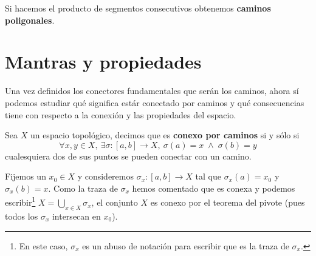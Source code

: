 \begin{ej}
Si hacemos el producto de segmentos consecutivos obtenemos \textbf{caminos poligonales}. 
\end{ej}

\section{Mantras y propiedades}%
\label{sec:conexion_por_caminos}
Una vez definidos los conectores fundamentales que serán los caminos, ahora sí podemos estudiar qué significa estár conectado por caminos y qué consecuencias tiene con respecto a la conexión y las propiedades del espacio.

\begin{defi}
Sea $X$ un espacio topológico, decimos que es \textbf{conexo por caminos} si y sólo si 
\[
\forall x, y \in X,\ \exists \sigma: \left[ a, b \right] \rightarrow X,\ \sigma\left( a \right) = x\; \land \;\sigma\left( b \right) = y
\]
cualesquiera dos de sus puntos se pueden conectar con un camino.
\end{defi}

\begin{obs}
Fijemos un $x_0\in X$ y consideremos $\sigma_x : [a,b]\rightarrow X$ tal que $\sigma_x(a) = x_0$ y $\sigma_x(b) = x$. Como la traza de $\sigma_x$ hemos comentado que es conexa y podemos escribir\footnote{En este caso, $\sigma_x$ es un abuso de notación para escribir que es la traza de $\sigma_x$.} $X = \bigcup_{x\in X} \sigma_x$, el conjunto $X$ es conexo por el teorema del pivote (pues todos los $\sigma_x$ intersecan en $x_0$).
\end{obs}

